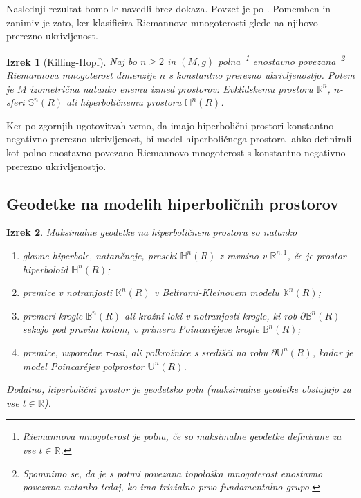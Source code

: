\documentclass[a4paper]{article}
\newtheorem{izrek}{Izrek}
\begin{document}
Naslednji rezultat bomo le navedli brez dokaza. Povzet je po \cite[Theorem 12.4 (Killing-Hopf)]{leeRM}. Pomemben in zanimiv je zato, ker klasificira Riemannove mnogoterosti glede na njihovo prerezno ukrivljenost.

\begin{izrek}[Killing-Hopf]
Naj bo $n \geq 2$ in $(M,g)$ polna~\footnote{Riemannova mnogoterost je \emph{polna}, če so maksimalne geodetke definirane za vse $t \in \mathbb{R}$.} enostavno povezana~\footnote{Spomnimo se, da je s potmi povezana topološka mnogoterost \emph{enostavno povezana} natanko tedaj, ko ima trivialno prvo fundamentalno grupo.} 
Riemannova mnogoterost dimenzije $n$ s konstantno prerezno ukrivljenostjo. Potem je $M$ izometrična natanko enemu izmed prostorov: Evklidskemu prostoru $\mathbb{R}^{n}$, $n$-sferi $\mathbb{S}^{n}(R)$ ali hiperboličnemu prostoru $\mathbb{H}^{n}(R)$.
\end{izrek}

Ker po zgornjih ugotovitvah vemo, da imajo hiperbolični prostori konstantno negativno prerezno ukrivljenost, bi model hiperboličnega prostora lahko definirali kot polno enostavno povezano Riemannovo mnogoterost s konstantno negativno prerezno ukrivljenostjo.

\subsection{Geodetke na modelih hiperboličnih prostorov}

\begin{izrek}
Maksimalne geodetke na hiperboličnem prostoru so natanko
\begin{enumerate}
\item glavne hiperbole, natančneje, preseki $\mathbb{H}^{n}(R)$ z ravnino v $\mathbb{R}^{n,1}$, če je prostor \textup{hiperboloid} $\mathbb{H}^{n}(R)$;
%
\item premice v notranjosti $\mathbb{K}^{n}(R)$ v \textup{Beltrami-Kleinovem modelu} $\mathbb{K}^{n}(R)$;
%
\item premeri krogle $\mathbb{B}^{n}(R)$ ali krožni loki v notranjosti krogle, ki rob $\partial\mathbb{B}^{n}(R)$ sekajo pod pravim kotom, v primeru \textup{Poincar\'ejeve krogle} $\mathbb{B}^{n}(R)$;
%
\item premice, vzporedne $\tau$-osi, ali polkrožnice s središči na robu $\partial\mathbb{U}^{n}(R)$, kadar je model \textup{Poincar\'ejev polprostor} $\mathbb{U}^{n}(R)$.
\end{enumerate}
Dodatno, hiperbolični prostor je geodetsko poln (maksimalne geodetke obstajajo za vse $t \in \mathbb{R}$).
\end{izrek}
\end{document}
